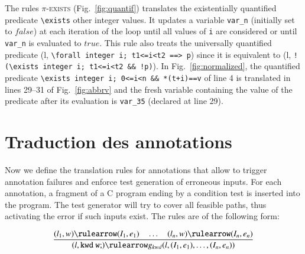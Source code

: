 The rules \textsc{$\pi$-exists}
(Fig.~\ref{fig:quantif}) translates the existentially
quantified predicate \lstinline|\exists| other integer values.
It updates
a variable \lstinline|var_n| (initially set to $false$) at each iteration of the
loop until all values of \lstinline|i| are considered or  
until \lstinline|var_n| is evaluated to $true$.
This rule also treats the universally quantified predicate
(l, \lstinline{\forall integer i; t1<=i<t2 ==> p}) since it
is equivalent to 
(l, \lstinline{! (\exists integer i; t1<=i<t2 && !p)}).
In Fig.~\ref{fig:normalized}, the quantified predicate
\lstinline{\exists integer i; 0<=i<n && *(t+i)==v} of 
line 4 is translated in lines 29--31 of Fig.~\ref{fig:abbrv}
and the fresh variable containing the value of the predicate after its
evaluation is \lstinline|var_35| (declared at line 29).


\section{Traduction des annotations \acsl}
\label{sec:annot}

Now we  define the translation rules for annotations that allow to trigger 
annotation failures and 
enforce 
test generation of erroneous inputs. For each annotation, a fragment of a C
program ending by a condition test is inserted into the program. The test
generator will try to cover all feasible paths, thus activating the error if
such inputs exist. The rules are of the following form:

\vspace{-4mm}
\[
\dfrac
    {(l_1, w) \rulearrow (I_1, e_1) \quad \ldots \quad
      (l_n, w) \rulearrow (I_n, e_n)}
    {(l, \mathtt{kwd\ w;}) \rulearrow
      g_{kwd} (l, (I_1, e_1), \ldots, (I_n, e_n))}
\]
\vspace{-4mm}


